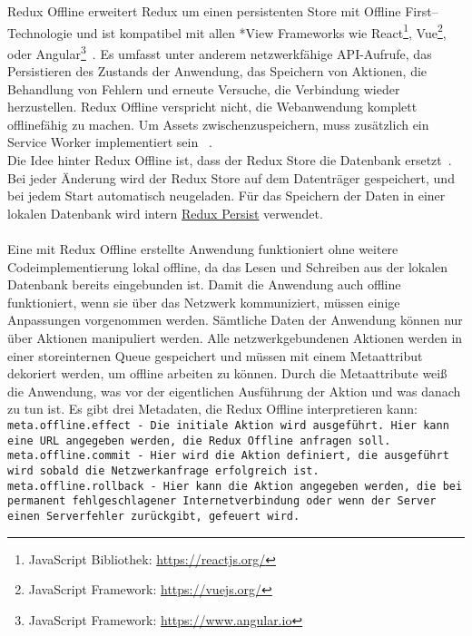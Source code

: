 % 
% 
Redux Offline erweitert Redux um einen persistenten Store mit Offline First--Technologie und ist kompatibel mit allen *View Frameworks wie React\footnote{JavaScript Bibliothek: \url{https://reactjs.org/}}, Vue\footnote{JavaScript Framework: \url{https://vuejs.org/}}, oder Angular\footnote{JavaScript Framework: \url{https://www.angular.io}}~\cite{redux-offline-compabilaty}.
Es umfasst unter anderem netzwerkfähige \gls{API}-Aufrufe, das Persistieren des Zustands der Anwendung, das Speichern von Aktionen, die Behandlung von Fehlern und erneute Versuche, die Verbindung wieder herzustellen.
Redux Offline verspricht nicht, die Webanwendung komplett offlinefähig zu machen.
Um \gls{Assets} zwischenzuspeichern, muss zusätzlich ein Service Worker implementiert sein ~\cite{redux-offline-gh}.\\
Die Idee hinter Redux Offline ist, dass der Redux Store die Datenbank ersetzt~\cite{redux-offline}.
Bei jeder Änderung wird der Redux Store auf dem Datenträger gespeichert, und bei jedem Start automatisch neugeladen.
Für das Speichern der Daten in einer lokalen Datenbank wird intern \hyperref[sub:reduxpersist]{Redux Persist} verwendet.\\\\
%
%
Eine mit Redux Offline erstellte Anwendung funktioniert ohne weitere Codeimplementierung lokal offline, da das Lesen und Schreiben aus der lokalen Datenbank bereits eingebunden ist.
Damit die Anwendung auch offline funktioniert, wenn sie über das Netzwerk kommuniziert, müssen einige Anpassungen vorgenommen werden.
Sämtliche Daten der Anwendung können nur über Aktionen manipuliert werden. 
Alle netzwerkgebundenen Aktionen werden in einer storeinternen \gls{Queue} gespeichert und müssen mit einem Metaattribut dekoriert werden, um offline arbeiten zu können. Durch die Metaattribute weiß die Anwendung, was vor der eigentlichen Ausführung der Aktion und was danach zu tun ist. 
Es gibt drei Metadaten, die Redux Offline interpretieren kann:\\
\tt{meta.offline.effect} - Die initiale Aktion wird ausgeführt. Hier kann eine URL angegeben werden, die Redux Offline anfragen soll.\\
\tt{meta.offline.commit} - Hier wird die Aktion definiert, die ausgeführt wird sobald die Netzwerkanfrage erfolgreich ist.\\
\tt{meta.offline.rollback} - Hier kann die Aktion angegeben werden, die bei permanent fehlgeschlagener Internetverbindung oder wenn der Server einen Serverfehler zurückgibt, gefeuert wird.
